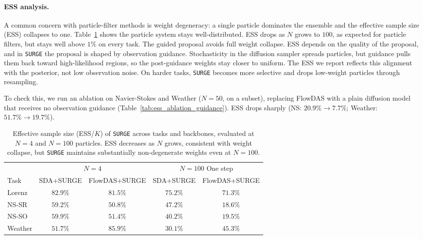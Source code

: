 \documentclass{article}
\theoremstyle{plain}
\theoremstyle{definition}
\theoremstyle{remark}
\begin{document}
\paragraph{ESS analysis.}
A common concern with particle-filter methods is weight degeneracy: a single particle dominates the ensemble and the effective sample size (ESS) collapses to one. Table~\ref{tab:ess_surge} shows the particle system stays well-distributed. ESS drops as $N$ grows to $100$, as expected for particle filters, but stays well above $1\%$ on every task. The guided proposal avoids full weight collapse.
ESS depends on the quality of the proposal, and in \texttt{SURGE} the proposal is shaped by observation guidance. Stochasticity in the diffusion sampler spreads particles, but guidance pulls them back toward high-likelihood regions, so the post-guidance weights stay closer to uniform. The ESS we report reflects this alignment with the posterior, not low observation noise. On harder tasks, \texttt{SURGE} becomes more selective and drops low-weight particles through resampling.

To check this, we run an ablation on Navier-Stokes and Weather ($N=50$, on a subset), replacing FlowDAS with a plain diffusion model that receives no observation guidance (Table~\ref{tab:ess_ablation_guidance}). ESS drops sharply (NS: $20.9\% \to 7.7\%$; Weather: $51.7\% \to 19.7\%$).

\begin{table}[t]
\caption{Effective sample size (ESS/$K$) of \texttt{SURGE} across tasks and backbones, evaluated at $N=4$ and $N=100$ particles. ESS decreases as $N$ grows, consistent with weight collapse, but \texttt{SURGE} maintains substantially non-degenerate weights even at $N=100$.}
\label{tab:ess_surge}
\begin{center}
\begin{small}
\begin{sc}
\begin{tabular}{lcccc}
\toprule
& \multicolumn{2}{c}{$N=4$} & \multicolumn{2}{c}{$N=100$ One step} \\
\cmidrule(lr){2-3} \cmidrule(lr){4-5}
Task & SDA+SURGE & FlowDAS+SURGE & SDA+SURGE & FlowDAS+SURGE \\
\midrule
Lorenz  & $82.9\%$ & $81.5\%$ & $75.2\%$ & $71.3\%$ \\
NS-SR   & $59.2\%$ & $50.8\%$ & $47.2\%$ & $18.6\%$ \\
NS-SO   & $59.9\%$ & $51.4\%$ & $40.2\%$ & $19.5\%$ \\
Weather & $51.7\%$ & $85.9\%$ & $30.1\%$ & $45.3\%$ \\
\bottomrule
\end{tabular}
\end{sc}
\end{small}
\end{center}
\end{table}
\end{document}
